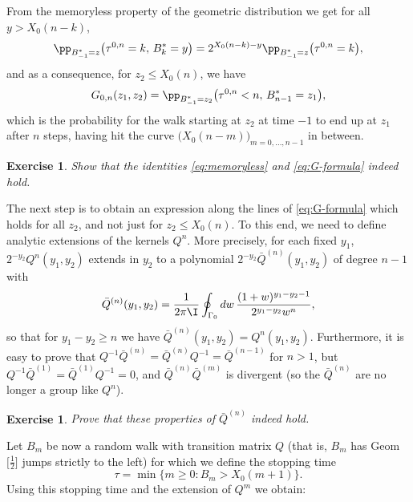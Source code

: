 \documentclass[]{pcmi}
\theoremstyle{plain}
\newtheorem{exercise}[equation]{Exercise}
\theoremstyle{definition}
\begin{document}
From the memoryless property of the geometric distribution we get for all $y > X_0(n-k)$,
\begin{equation}\label{eq:memoryless}
\pp_{B^*_{-1}=z}\big(\tau^{0,n}=k,\,B^*_k=y\big)=2^{X_0(n-k)-y}\pp_{B^*_{-1}=z}\big(\tau^{0,n}=k\big),
\end{equation}
and as a consequence, for $z_2\leq X_0(n)$, we have
\begin{equation}\label{eq:G-formula}
   G_{0,n}(z_1,z_2)=\pp_{B^*_{-1}=z_2}\big(\tau^{0,n}<n,\,B^*_{n-1}=z_1\big),
\end{equation}
which is the probability for the walk starting at $z_2$ at time $-1$ to end up at $z_1$ after $n$ steps, having hit the curve $\big(X_0(n-m)\big)_{m=0,\ldots,n-1}$ in between.

\begin{exercise} 
Show that the identities \eqref{eq:memoryless} and \eqref{eq:G-formula} indeed hold.
\end{exercise}

\noindent The next step is to obtain an expression along the lines of \eqref{eq:G-formula} which holds for all $z_2$, and not just for $z_2\leq X_0(n)$. To this end, we need to define analytic extensions of the kernels $Q^n$. More precisely, for each fixed $y_1$, $2^{-y_2}Q^n(y_1,y_2)$ extends in $y_2$ to a  polynomial $2^{-y_2}\bar{Q}^{(n)}(y_1,y_2)$ of degree $n-1$ with 
\begin{equation}
\bar{Q}^{(n)}(y_1,y_2)= \frac{1}{2\pi \I} \oint_{\Gamma_0} dw\,\frac{(1+w)^{y_1 - y_2 -1}}{2^{y_1-y_2} w^n},
\end{equation}
so that for $y_1-y_2\geq n$ we have $\bar{Q}^{(n)}(y_1,y_2)=Q^n(y_1,y_2)$. Furthermore, it is easy to prove that
$Q^{-1}\bar{Q}^{(n)}=\bar{Q}^{(n)}Q^{-1}=\bar{Q}^{(n-1)}$ for $n>1$, but $Q^{-1}\bar{Q}^{(1)}=\bar{Q}^{(1)}Q^{-1}=0$, and
$\bar{Q}^{(n)}\bar{Q}^{(m)}$ is divergent (so the $\bar{Q}^{(n)}$ are no longer a group like $Q^n$).

\begin{exercise} 
Prove that these properties of $\bar{Q}^{(n)}$ indeed hold.
\end{exercise}

\noindent Let $B_m$ be now a random walk with transition matrix $Q$ (that is, $B_m$ has Geom$\bigl[\tfrac{1}{2}\bigr]$ jumps strictly to the left) for which we define the stopping time
\begin{equation}\label{eq:deftau}
 \tau= \min\bigl\{ m\ge 0: B_m> X_0(m+1)\bigr\}.
\end{equation}
Using this stopping time and the extension of $Q^m$ we obtain:
\end{document}
